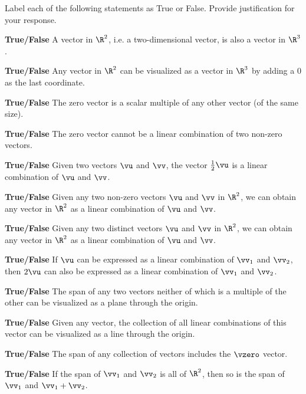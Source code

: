 \item Label each of the following statements as True or False. Provide justification for your response.
\ba
\item \textbf{True/False} A vector in $\R^2$, i.e. a two-dimensional vector, is also a vector in $\R^3$.

\item \textbf{True/False} Any vector in $\R^2$ can be visualized as a vector in $\R^3$ by adding a 0 as the last coordinate.

\item \textbf{True/False} The zero vector is a scalar multiple of any other vector (of the same size).

\item \textbf{True/False} The zero vector cannot be a linear combination of two non-zero vectors.

\item \textbf{True/False} Given two vectors $\vu$ and $\vv$, the vector $\frac{1}{2}\vu$ is a linear combination of $\vu$ and $\vv$.

\item \textbf{True/False} Given any two non-zero vectors $\vu$ and $\vv$ in $\R^2$, we can obtain any vector in $\R^2$ as a linear combination of $\vu$ and $\vv$.

\item \textbf{True/False} Given any two distinct vectors $\vu$ and $\vv$ in $\R^2$, we can obtain any vector in $\R^2$ as a linear combination of $\vu$ and $\vv$.

\item \textbf{True/False} If $\vu$ can be expressed as a linear combination of $\vv_1$ and $\vv_2$, then $2\vu$ can also be expressed as a linear combination of $\vv_1$ and $\vv_2$.

\item \textbf{True/False} The span of any two vectors neither of which is a multiple of the other can be visualized as a plane through the origin.

\item \textbf{True/False} Given any vector, the collection of all linear combinations of this vector can be visualized as a line through the origin.

\item \textbf{True/False} The span of any collection of vectors includes the $\vzero$ vector.

\item \textbf{True/False} If the span of $\vv_1$ and $\vv_2$ is all of
$\R^2$, then so is the span of $\vv_1$ and $\vv_1+\vv_2$.

